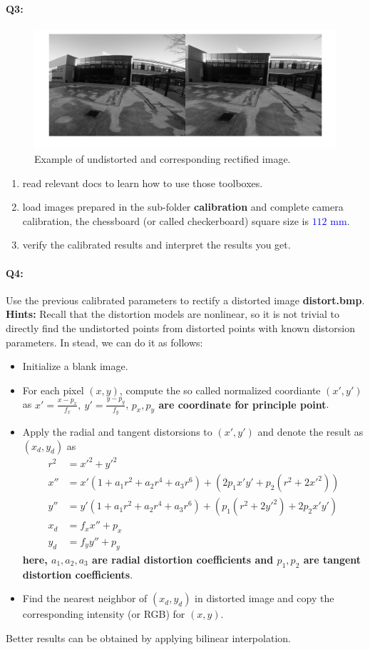 \documentclass[a4paper]{article}
\begin{document}
\paragraph{Q3:}
\begin{figure}[!b]
\centering
\includegraphics[scale=0.2]{figures/rec.png}
\caption{Example of undistorted and corresponding rectified image.}
\end{figure}
\begin{enumerate}
\item read relevant docs to learn how to use those toolboxes.
\item load images prepared in the sub-folder \textbf{calibration} and complete camera calibration, the chessboard (or called checkerboard) square size is \textcolor{blue}{$112$ mm}.
\item verify the calibrated results and interpret the results you get.
\end{enumerate}
\paragraph{Q4:}
Use the previous calibrated parameters to rectify a distorted image \textbf{distort.bmp}.
\textbf{Hints:}
Recall that the distortion models are nonlinear, so it is not trivial to directly find the undistorted points from distorted points with known distorsion parameters. In stead, we can do it as follows:
\begin{itemize}
	\item Initialize a blank image.
	\item For each pixel $(x,y)$, compute the so called normalized coordiante $(x',y')$ as $x'=\frac{x-p_x}{f_x},\ y'=\frac{y-p_y}{f_y}$, \textbf{$p_x,p_y$ are coordinate for principle point}.
	\item Apply the radial and tangent distorsions to $(x',y')$ and denote the result as $(x_d,y_d)$ as
	\begin{align*}
		r^2 &= x'^2+y'^2 \\
		x'' &= x'(1+a_1r^2+a_2r^4+a_3r^6)+(2p_1x'y'+p_2(r^2+2x'^2)) \\
		y'' &= y'(1+a_1r^2+a_2r^4+a_3r^6)+(p_1(r^2+2y'^2)+2p_2x'y') \\
		x_d &= f_xx''+p_x\\
		y_d &=f_yy''+p_y
	\end{align*}
	\textbf{here, $a_1,a_2,a_3$ are radial distortion coefficients and $p_1,p_2$ are tangent distortion coefficients}.
	\item Find the nearest neighbor of $(x_d,y_d)$ in distorted image and copy the corresponding intensity (or RGB) for $(x,y)$.
\end{itemize}
Better results can be obtained by applying bilinear interpolation.
\end{document}
